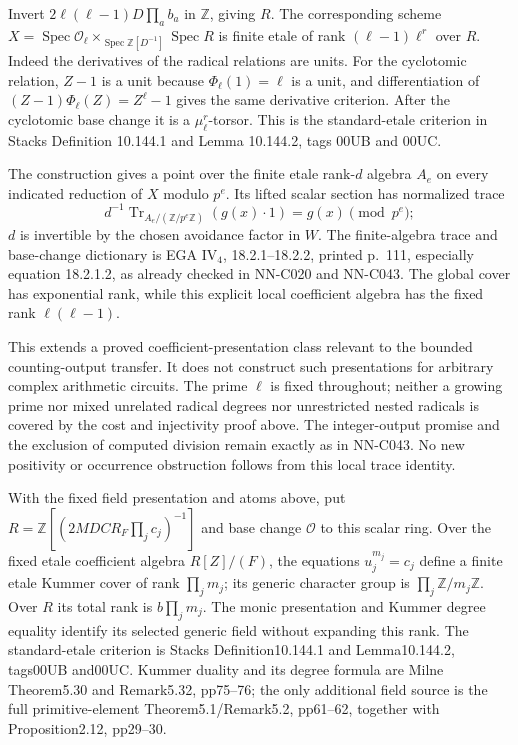 \begin{geometricstatement}[NN-C043]
Invert $2\ell(\ell-1)D\prod_a b_a$ in $\mathbb Z$, giving $R$.
The corresponding scheme $X=\operatorname{Spec}\mathcal O_\ell
\times_{\operatorname{Spec}\mathbb Z[D^{-1}]}\operatorname{Spec}R$
is finite etale of rank $(\ell-1)\ell^r$ over $R$.
Indeed the derivatives of the radical relations are units.
For the cyclotomic relation, $Z-1$ is a unit because
$\Phi_\ell(1)=\ell$ is a unit, and differentiation of
$(Z-1)\Phi_\ell(Z)=Z^\ell-1$ gives the same derivative criterion.
After the cyclotomic base change it is a $\mu_\ell^r$-torsor.
This is the standard-etale criterion in Stacks
Definition 10.144.1 and Lemma 10.144.2, tags 00UB and 00UC.

The construction gives a point over the finite etale rank-$d$
algebra $A_e$ on every indicated reduction of $X$ modulo $p^e$.
Its lifted scalar section has normalized trace
\[
       d^{-1}\operatorname{Tr}_{A_e/(\mathbb Z/p^e\mathbb Z)}
                          (g(x)\cdot1)=g(x)\pmod{p^e};
\]
$d$ is invertible by the chosen avoidance factor in $W$.
The finite-algebra trace and base-change dictionary is
EGA IV$_4$, 18.2.1--18.2.2, printed p.~111, especially
equation 18.2.1.2, as already checked in NN-C020 and NN-C043.
The global cover has exponential rank, while this explicit
local coefficient algebra has the fixed rank $\ell(\ell-1)$.

This extends a proved coefficient-presentation class relevant
to the bounded counting-output transfer. It does not construct
such presentations for arbitrary complex arithmetic circuits.
The prime $\ell$ is fixed throughout; neither a growing prime
nor mixed unrelated radical degrees nor unrestricted nested
radicals is covered by the cost and injectivity proof above.
The integer-output promise and the exclusion of computed
division remain exactly as in NN-C043. No new positivity or
occurrence obstruction follows from this local trace identity.

With the fixed field presentation and atoms above, put
$R=\mathbb Z[(2MDC R_F\prod_jc_j)^{-1}]$ and base change
$\mathcal O$ to this scalar ring. Over the fixed etale coefficient
algebra $R[Z]/(F)$,
the equations $u_j^{m_j}=c_j$ define a finite etale Kummer cover of
rank $\prod_jm_j$; its generic character group is
$\prod_j\mathbb Z/m_j\mathbb Z$. Over $R$ its total rank is
$b\prod_jm_j$. The monic presentation and Kummer degree equality
identify its selected generic field without expanding this rank.
The standard-etale criterion is Stacks Definition10.144.1 and
Lemma10.144.2, tags00UB and00UC. Kummer duality and its degree formula
are Milne Theorem5.30 and Remark5.32, pp75--76; the only additional
field source is the full primitive-element Theorem5.1/Remark5.2,
pp61--62, together with Proposition2.12, pp29--30.


\end{geometricstatement}
